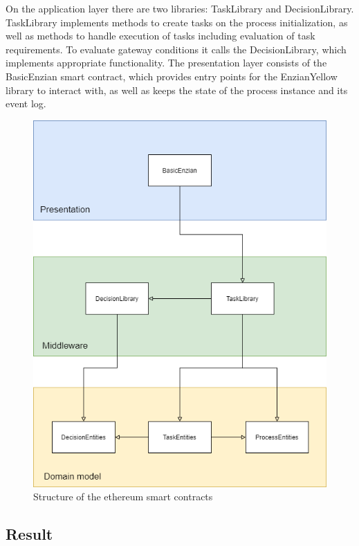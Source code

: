 On the application layer there are two libraries: TaskLibrary and DecisionLibrary. TaskLibrary implements methods to create tasks on the process initialization, as well as methods to handle execution of tasks including evaluation of task requirements. To evaluate gateway conditions it calls the DecisionLibrary, which implements appropriate functionality.\newline
The presentation layer consists of the BasicEnzian smart contract, which provides entry points for the EnzianYellow library to interact with, as well as keeps the state of the process instance and its event log. 

\begin{figure}[h]
	\includegraphics[width=\textwidth]{gfx/eth-contracts}
	\caption{Structure of the ethereum smart contracts}
	\label{fig:impr:eth:contracts}
\end{figure}

\subsection{Result}
\label{sec:impr:eth:result}

